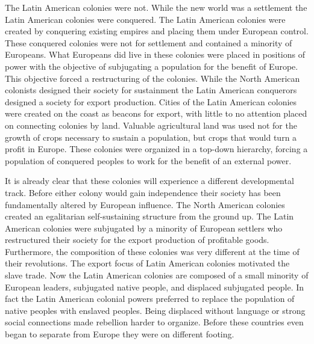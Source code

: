 \documentclass[a4paper, 12pt]{article}
\begin{document}
The Latin American colonies were not. While the new world was a settlement the Latin American colonies were conquered. The Latin American colonies were created by conquering existing empires and placing them under European control. These conquered colonies were not for settlement and contained a minority of Europeans. What Europeans did live in these colonies were placed in positions of power with the objective of subjugating a population for the benefit of Europe. This objective forced a restructuring of the colonies. While the North American colonists designed their society for sustainment the Latin American conquerors designed a society for export production. Cities of the Latin American colonies were created on the coast as beacons for export, with little to no attention placed on connecting colonies by land. Valuable agricultural land was used not for the growth of crops necessary to sustain a population, but crops that would turn a profit in Europe. These colonies were organized in a top-down hierarchy, forcing a population of conquered peoples to work for the benefit of an external power.

It is already clear that these colonies will experience a different developmental track. Before either colony would gain independence their society has been fundamentally altered by European influence. The North American colonies created an egalitarian self-sustaining structure from the ground up. The Latin American colonies were subjugated by a minority of European settlers who restructured their society for the export production of profitable goods. Furthermore, the composition of these colonies was very different at the time of their revolutions. The export focus of Latin American colonies motivated the slave trade. Now the Latin American colonies are composed of a small minority of European leaders, subjugated native people, and displaced subjugated people. In fact the Latin American colonial powers preferred to replace the population of native peoples with enslaved peoples. Being displaced without language or strong social connections made rebellion harder to organize. Before these countries even began to separate from Europe they were on different footing.
\end{document}
